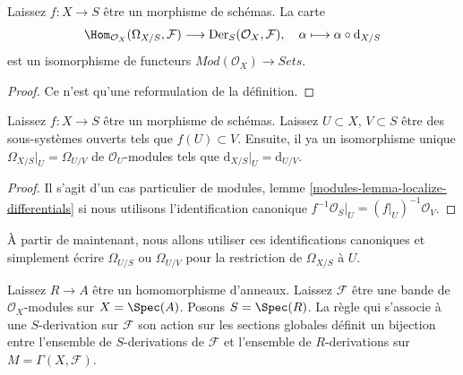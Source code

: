 \begin{lemma}

\label{lemma-universal-derivation-universal}
Laissez $f : X \to S$ être un morphisme de schémas. La carte $$
\Hom_{\mathcal{O}_X}(\Omega_{X/S}, \mathcal{F})
\longrightarrow
\text{Der}_S(\mathcal{O}_X, \mathcal{F}),\quad
\alpha \longmapsto \alpha \circ \text{d}_{X/S}
$$ est un isomorphisme de functeurs $\textit{Mod}(\mathcal{O}_X) \to \textit{Sets}$.
\end{lemma}

\begin{proof}

Ce n'est qu'une reformulation de la définition.

\end{proof}

\begin{lemma}

\label{lemma-differentials-restrict-open}
Laissez $f : X \to S$ être un morphisme de schémas. Laissez $U \subset X$, $V \subset S$ être des sous-systèmes ouverts tels que $f(U) \subset V$. Ensuite, il ya un isomorphisme unique $\Omega_{X/S}|_U = \Omega_{U/V}$ de $\mathcal{O}_U$-modules tels que $\text{d}_{X/S}|_U = \text{d}_{U/V}$.
\end{lemma}

\begin{proof}
Il s'agit d'un cas particulier de modules, lemme \ref{modules-lemma-localize-differentials} si nous utilisons l'identification canonique $f^{-1}\mathcal{O}_S|_U = (f|_U)^{-1}\mathcal{O}_V$.
\end{proof}

\noindent
À partir de maintenant, nous allons utiliser ces identifications canoniques et simplement écrire $\Omega_{U/S}$ ou $\Omega_{U/V}$ pour la restriction de $\Omega_{X/S}$ à $U$.

\begin{lemma}

\label{lemma-affine-case-derivation}
Laissez $R \to A$ être un homomorphisme d'anneaux. Laissez $\mathcal{F}$ être une bande de $\mathcal{O}_X$-modules sur $X = \Spec(A)$. Posons $S = \Spec(R)$. La règle qui s'associe à une $S$-derivation sur $\mathcal{F}$ son action sur les sections globales définit un bijection entre l'ensemble de $S$-derivations de $\mathcal{F}$ et l'ensemble de $R$-derivations sur $M = \Gamma(X, \mathcal{F})$.
\end{lemma}

